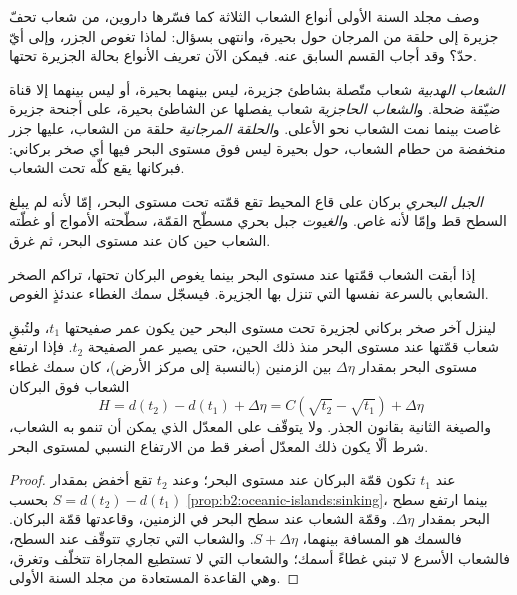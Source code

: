 وصف مجلد السنة الأولى أنواع الشعاب الثلاثة كما فسّرها داروين، من شعاب تحفّ
جزيرة إلى حلقة من المرجان حول بحيرة، وانتهى بسؤال: لماذا تغوص الجزر،
وإلى أيّ حدّ؟ وقد أجاب القسم السابق عنه. فيمكن الآن تعريف الأنواع بحالة
الجزيرة تحتها.

\begin{definition}\label{def:b2:oceanic-islands:reefs}
\emph{الشعاب الهدبية} شعاب متّصلة بشاطئ جزيرة، ليس بينهما
بحيرة، أو ليس بينهما إلا قناة ضيّقة ضحلة. و\emph{الشعاب الحاجزية}
شعاب يفصلها عن الشاطئ بحيرة، على أجنحة جزيرة غاصت بينما
نمت الشعاب نحو الأعلى. و\emph{الحلقة المرجانية} حلقة من الشعاب، عليها جزر منخفضة من حطام الشعاب،
حول بحيرة ليس فوق مستوى البحر فيها أي صخر بركاني: فبركانها يقع كلّه تحت الشعاب.
\end{definition}

\begin{definition}\label{def:b2:oceanic-islands:seamount}
\emph{الجبل البحري} بركان على قاع المحيط تقع قمّته تحت مستوى
البحر، إمّا لأنه لم يبلغ السطح قط وإمّا لأنه غاص. و\emph{الغيوت}
جبل بحري مسطّح القمّة، سطّحته الأمواج أو غطّته الشعاب حين
كان عند مستوى البحر، ثم غرق.
\end{definition}

إذا أبقت الشعاب قمّتها عند مستوى البحر بينما يغوص البركان تحتها، تراكم الصخر الشعابي بالسرعة
نفسها التي تنزل بها الجزيرة. فيسجّل سمك الغطاء عندئذٍ الغوص.

\begin{proposition}\label{prop:b2:oceanic-islands:cap}
لينزل آخر صخر بركاني لجزيرة تحت مستوى البحر حين يكون عمر صفيحتها $t_1$، ولتُبقِ
شعاب قمّتها عند مستوى البحر منذ ذلك الحين، حتى يصير عمر الصفيحة $t_2$. فإذا ارتفع مستوى البحر
بمقدار $\Delta\eta$ بين الزمنين (بالنسبة إلى مركز الأرض)، كان سمك غطاء الشعاب
فوق البركان
\[
H = d(t_2) - d(t_1) + \Delta\eta = C\left(\sqrt{t_2} - \sqrt{t_1}\right) + \Delta\eta
\]
والصيغة الثانية بقانون الجذر. ولا يتوقّف على المعدّل الذي يمكن أن تنمو به الشعاب،
شرط ألّا يكون ذلك المعدّل أصغر قط من الارتفاع النسبي لمستوى البحر.
\end{proposition}

\begin{proof}
عند $t_1$ تكون قمّة البركان عند مستوى البحر؛ وعند $t_2$ تقع أخفض بمقدار $S = d(t_2) - d(t_1)$ بحسب
\cref{prop:b2:oceanic-islands:sinking}، بينما ارتفع سطح البحر بمقدار $\Delta\eta$. وقمّة
الشعاب عند سطح البحر في الزمنين، وقاعدتها قمّة البركان. فالسمك
هو المسافة بينهما، $S + \Delta\eta$. والشعاب التي تجاري تتوقّف عند
السطح، فالشعاب الأسرع لا تبني غطاءً أسمك؛ والشعاب التي لا تستطيع المجاراة تتخلّف
وتغرق، وهي القاعدة المستعادة من مجلد السنة الأولى.
\end{proof}


